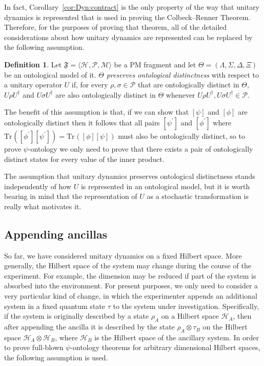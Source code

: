 \documentclass[DIV=calc,paper=a4,fontsize=11pt,twocolumn]{scrartcl} %
\theoremstyle{definition}
\newtheorem{definition}{Definition}[section]
\theoremstyle{plain}
\newcommand{\Proj}[1]{\ensuremath{\left [ #1 \right ]}}
\newcommand{\Hilb}[1][]{\ensuremath{\mathcal{H}_{#1}}}
\newcommand{\Tr}[2][]{\ensuremath{\text{Tr}_{#1} \left ( #2 \right )}}
\begin{document}
In fact, Corollary~\ref{cor:Dyn:contract} is the only property of the
way that unitary dynamics is represented that is used in proving the
Colbeck--Renner Theorem.  Therefore, for the purposes of proving that
theorem, all of the detailed considerations about how unitary dynamics
are represented can be replaced by the following assumption.
\begin{definition}
\label{def:Dyn:uind}
Let $\mathfrak{F} = \langle \Hilb, \mathcal{P}, \mathcal{M} \rangle$
be a PM fragment and let $\Theta = (\Lambda, \Sigma, \Delta, \Xi)$
be an ontological model of it.  $\Theta$ \emph{preserves ontological
distinctness} with respect to a unitary operator $U$ if, for every
$\rho, \sigma \in \mathcal{P}$ that are ontologically distinct in
$\Theta$, $U \rho U^{\dagger}$ and $U \sigma U^{\dagger}$ are also
ontologically distinct in $\Theta$ whenever $U \rho U^{\dagger}, U
\sigma U^{\dagger} \in \mathcal{P}$.
\end{definition}
The benefit of this assumption is that, if we can show that
$\Proj{\psi}$ and $\Proj{\phi}$ are ontologically distinct then it
follows that all pairs $\Proj{\psi^{\prime}}$ and
$\Proj{\phi^{\prime}}$ where
$\Tr{\Proj{\phi^{\prime}}\Proj{\psi^{\prime}}} =
\Tr{\Proj{\phi}\Proj{\psi}}$ must also be ontologically distinct, so
to prove $\psi$-ontology we only need to prove that there exists a
pair of ontologically distinct states for every value of the inner
product.

The assumption that unitary dynamics preserves ontological
distinctness stands independently of how $U$ is represented in an
ontological model, but it is worth bearing in mind that the
representation of $U$ as a stochastic transformation is really what
motivates it.

\subsection{Appending ancillas}

\label{Dyn:Bet}

So far, we have considered unitary dynamics on a fixed Hilbert space.
More generally, the Hilbert space of the system may change during the
course of the experiment.  For example, the dimension may be reduced
if part of the system is absorbed into the environment.  For present
purposes, we only need to consider a very particular kind of change,
in which the experimenter appends an additional system in a fixed
quantum state $\tau$ to the system under investigation.  Specifically,
if the system is originally described by a state $\rho_A$ on a Hilbert
space $\Hilb[A]$, then after appending the ancilla it is described by
the state $\rho_A \otimes \tau_B$ on the Hilbert space $\Hilb[A]
\otimes \Hilb[B]$, where $\Hilb[B]$ is the Hilbert space of the
ancillary system.  In order to prove full-blown $\psi$-ontology
theorems for arbitrary dimensional Hilbert spaces, the following
assumption is used.
\end{document}
